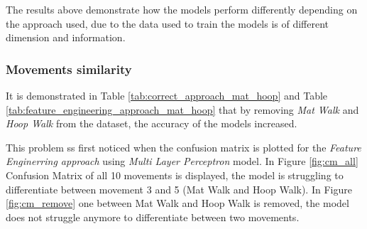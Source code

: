             The results above demonstrate how the models perform differently depending on the approach used, due to the data used to train the models is of different dimension and information. 

        \subsubsection{Movements similarity}   
        
            It is demonstrated in Table \ref{tab:correct_approach_mat_hoop} and Table \ref{tab:feature_engineering_approach_mat_hoop} that by removing \textit{Mat Walk} and \textit{Hoop Walk} from the dataset, the accuracy of the models increased.

            This problem ss first noticed when the confusion matrix is plotted for the \textit{Feature Enginerring approach} using \textit{Multi Layer Perceptron} model. In
            Figure \ref{fig:cm_all} Confusion Matrix of all 10 movements is displayed, the model is struggling to differentiate between movement 3 and 5 (Mat Walk and Hoop Walk). In Figure \ref{fig:cm_remove} one between Mat Walk and Hoop Walk is removed, the model does not struggle anymore to differentiate between two movements.
            

